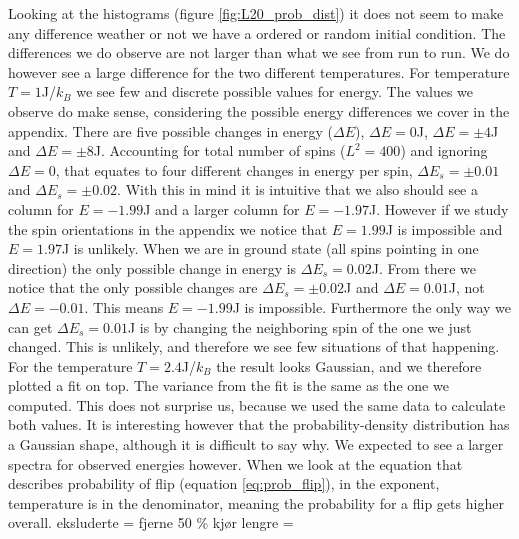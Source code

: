 \documentclass[reprint, english,notitlepage,nofootinbib]{revtex4-1}  %
\begin{document}
Looking at the histograms (figure \ref{fig:L20_prob_dist}) it does not seem to make any difference weather or not we have a ordered or random initial condition. The differences we do observe are not larger than what we see from run to run. We do however see a large difference for the two different temperatures. For temperature $T = 1$J/$k_B$ we see few and discrete possible values for energy. The values we observe do make sense, considering the possible energy differences we cover in the appendix. There are five possible changes in energy ($\Delta E$), $\Delta E = 0$J, $\Delta E = \pm 4$J and $\Delta E = \pm8$J. Accounting for total number of spins ($L^2 = 400$) and ignoring $\Delta E = 0$, that equates to four different changes in energy per spin, $\Delta E_s = \pm0.01$ and $\Delta E_s = \pm0.02$. With this in mind it is intuitive that we also should see a column for $E = -1.99$J and a larger column for $E = -1.97$J. However if we study the spin orientations in the appendix we notice that $E=1.99$J is impossible and $E = 1.97$J is unlikely. When we are in ground state (all spins pointing in one direction) the only possible change in energy is $\Delta E_s=0.02$J. From there we notice that the only possible changes are $\Delta E_s = \pm 0.02$J and $\Delta E = 0.01$J, not $\Delta E = -0.01$. This means $E = -1.99$J is impossible. Furthermore the only way we can get $\Delta E_s=0.01$J is by changing the neighboring spin of the one we just changed. This is unlikely, and therefore we see few situations of that happening. For the temperature $T = 2.4$J/$k_B$ the result looks Gaussian, and we therefore plotted a fit on top. The variance from the fit is the same as the one we computed. This does not surprise us, because we used the same data to calculate both values. It is interesting however that the probability-density distribution has a Gaussian shape, although it is difficult to say why. We expected to see a larger spectra for observed energies however. When we look at the equation that describes probability of flip (equation \eqref{eq:prob_flip}), in the exponent, temperature is in the denominator, meaning the probability for a flip gets higher overall. 
eksluderte = fjerne 50 \%
kjør lengre =
\end{document}
